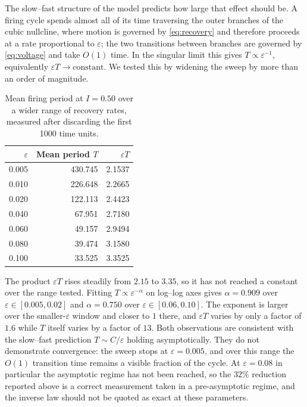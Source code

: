 \documentclass[11pt,a4paper]{article}
\begin{document}
The slow--fast structure of the model predicts how large that effect should be. A firing cycle spends almost all of its time traversing the outer branches of the cubic nullcline, where motion is governed by \eqref{eq:recovery} and therefore proceeds at a rate proportional to \(\varepsilon\); the two transitions between branches are governed by \eqref{eq:voltage} and take \(O(1)\) time. In the singular limit this gives \(T\propto\varepsilon^{-1}\), equivalently \(\varepsilon T\to\text{constant}\). We tested this by widening the sweep by more than an order of magnitude.

\begin{table}[H]
  \centering
  \caption{Mean firing period at \(I=0.50\) over a wider range of recovery rates, measured after discarding the first 1000 time units.}
  \label{tab:scaling}
  \small
  \begin{tabular}{@{}rrr@{}}
    \toprule
    \(\varepsilon\) & Mean period \(T\) & \(\varepsilon T\)\\
    \midrule
    0.005 & 430.745 & 2.1537\\
    0.010 & 226.648 & 2.2665\\
    0.020 & 122.113 & 2.4423\\
    0.040 & \ 67.951 & 2.7180\\
    0.060 & \ 49.157 & 2.9494\\
    0.080 & \ 39.474 & 3.1580\\
    0.100 & \ 33.525 & 3.3525\\
    \bottomrule
  \end{tabular}
\end{table}

The product \(\varepsilon T\) rises steadily from \(2.15\) to \(3.35\), so it has not reached a constant over the range tested. Fitting \(T\propto\varepsilon^{-\alpha}\) on log--log axes gives \(\alpha=0.909\) over \(\varepsilon\in[0.005,0.02]\) and \(\alpha=0.750\) over \(\varepsilon\in[0.06,0.10]\). The exponent is larger over the smaller-\(\varepsilon\) window and closer to \(1\) there, and \(\varepsilon T\) varies by only a factor of \(1.6\) while \(T\) itself varies by a factor of \(13\). Both observations are consistent with the slow--fast prediction \(T\sim C/\varepsilon\) holding asymptotically. They do not demonstrate convergence: the sweep stops at \(\varepsilon=0.005\), and over this range the \(O(1)\) transition time remains a visible fraction of the cycle. At \(\varepsilon=0.08\) in particular the asymptotic regime has not been reached, so the \(32\%\) reduction reported above is a correct measurement taken in a pre-asymptotic regime, and the inverse law should not be quoted as exact at these parameters.
\end{document}
